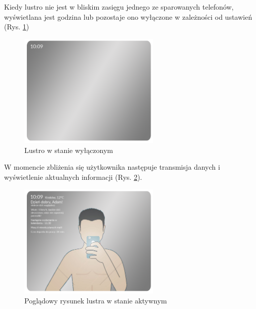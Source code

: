 \documentclass[a4paper,11pt]{article}
\begin{document}
Kiedy lustro nie jest w bliskim zasięgu jednego ze sparowanych telefonów, wyświetlana jest godzina lub pozostaje ono wyłączone w zależności od ustawień (Rys. \ref{lustro_off})

\begin{figure}[H]
	\includegraphics[width=0.6\textwidth,center]{mirror_off.png}
	\caption {Lustro w stanie wyłączonym}
	\label{lustro_off}
\end{figure}

W momencie zbliżenia się użytkownika następuje transmisja danych i wyświetlenie aktualnych informacji (Rys. \ref{lustro_on}).

\begin{figure}[H]
	\includegraphics[width=0.6\textwidth,center]{mirror_on.png}
	\caption {Poglądowy rysunek lustra w stanie aktywnym}
	\label{lustro_on}
\end{figure}
\end{document}
